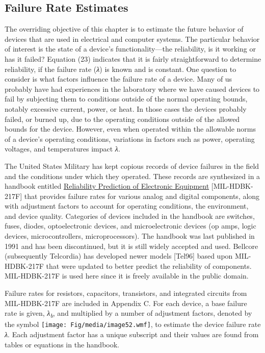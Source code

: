 \subsection{Failure Rate Estimates}\label{failure-rate-estimates}

The overriding objective of this chapter is to estimate the future
behavior of devices that are used in electrical and computer systems.
The particular behavior of interest is the state of a device's
functionality---the reliability, is it working or has it failed?
Equation (23) indicates that it is fairly straightforward to determine
reliability, if the failure rate (\emph{λ}) is known and is constant.
One question to consider is what factors influence the failure rate of a
device. Many of us probably have had experiences in the laboratory where
we have caused devices to fail by subjecting them to conditions outside
of the normal operating bounds, notably excessive current, power, or
heat. In those cases the devices probably failed, or burned up, due to
the operating conditions outside of the allowed bounds for the device.
However, even when operated within the allowable norms of a device's
operating conditions, variations in factors such as power, operating
voltages, and temperatures impact \emph{λ}.

The United States Military has kept copious records of device failures
in the field and the conditions under which they operated. These records
are synthesized in a handbook entitled \ul{Reliability Prediction of
Electronic Equipment} {[}MIL-HDBK-217F{]} that provides failure rates
for various analog and digital components, along with adjustment factors
to account for operating conditions, the environment, and device
quality. Categories of devices included in the handbook are switches,
fuses, diodes, optoelectronic devices, and microelectronic devices (op
amps, logic devices, microcontrollers, microprocessors). The handbook
was last published in 1991 and has been discontinued, but it is still
widely accepted and used. Bellcore (subsequently Telcordia) has
developed newer models {[}Tel96{]} based upon MIL-HDBK-217F that were
updated to better predict the reliability of components. MIL-HDBK-217F
is used here since it is freely available in the public domain.

Failure rates for resistors, capacitors, transistors, and integrated
circuits from MIL-HDBK-217F are included in Appendix C. For each device,
a base failure rate is given, \emph{λ\textsubscript{b}}, and multiplied
by a number of adjustment factors, denoted by the symbol
\texttt{[image: Fig/media/image52.wmf]}, to estimate the device failure
rate \emph{λ}. Each adjustment factor has a unique subscript and their
values are found from tables or equations in the handbook.

